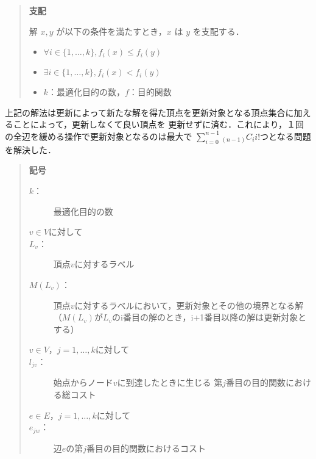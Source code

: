 \documentclass[12pt]{optlab-bachelor}
\begin{document}
\begin{quote}
  \textbf{支配}

    解 $x,y$ が以下の条件を満たすとき，$x$ は $y$ を支配する．
    \begin{itemize}
      \item $\forall i \in \{1,\ldots,k\},f_i(x) \le f_i(y)$
      \item $\exists i \in \{1,\ldots,k\},f_i(x) < f_i(y)$
      \item $k$：最適化目的の数，$f$：目的関数
    \end{itemize}
\end{quote}


上記の解法は更新によって新たな解を得た頂点を更新対象となる頂点集合に加えることによって，更新しなくて良い頂点を
更新せずに済む．これにより，１回の全辺を緩める操作で更新対象となるのは最大で
$\displaystyle \sum_{i=0}^{n-1} {}_{(n-1)}C_i i!$つとなる問題を解決した．



\begin{quote}
  \textbf{記号}
  \begin{description}
    \item[$k$：] 最適化目的の数
    \item[$v \in V$に対して]
    \item[$L_v$：] 頂点$v$に対するラベル
    \item[$M(L_v)$：] 頂点$v$に対するラベルにおいて，更新対象とその他の境界となる解
    （$M(L_v)$が$L_v$のi番目の解のとき，i+1番目以降の解は更新対象とする）
    \item[$v \in V$，$j = 1 , \ldots , k$に対して]
    \item[$l_{jv}$：] 始点からノード$v$に到達したときに生じる
    第$j$番目の目的関数における総コスト
    \item[$e \in E$，$j = 1 , \ldots , k$に対して]
    \item[$e_{jw}$：] 辺$e$の第$j$番目の目的関数におけるコスト
  \end{description}
\end{quote}
\end{document}
